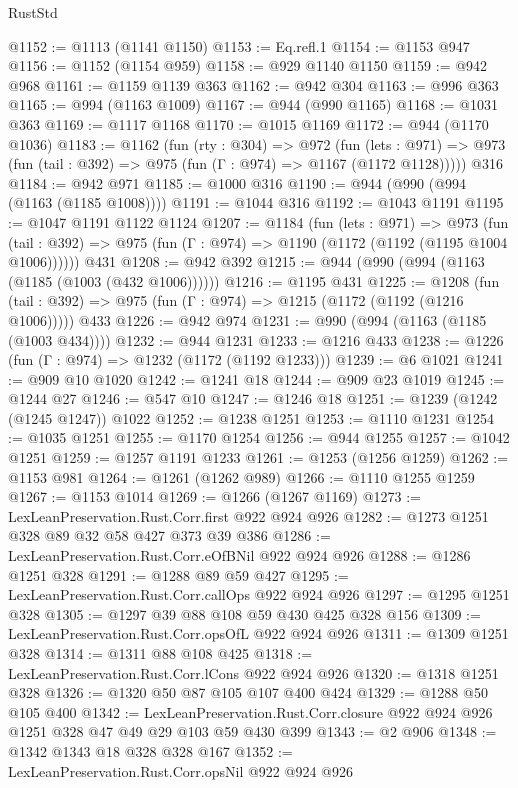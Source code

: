 \begin{lexlean}{RustStd}
\begin{coremodule}
@1152 := @1113 (@1141 @1150)
@1153 := Eq.refl.{1}
@1154 := @1153 @947
@1156 := @1152 (@1154 @959)
@1158 := @929 @1140 @1150
@1159 := @942 @968
@1161 := @1159 @1139 @363
@1162 := @942 @304
@1163 := @996 @363
@1165 := @994 (@1163 @1009)
@1167 := @944 (@990 @1165)
@1168 := @1031 @363
@1169 := @1117 @1168
@1170 := @1015 @1169
@1172 := @944 (@1170 @1036)
@1183 := @1162
    (fun (rty : @304) =>
    @972
      (fun (lets : @971) =>
      @973 (fun (tail : @392) => @975 (fun (Γ : @974) => @1167 (@1172 @1128)))))
    @316
@1184 := @942 @971
@1185 := @1000 @316
@1190 := @944 (@990 (@994 (@1163 (@1185 @1008))))
@1191 := @1044 @316
@1192 := @1043 @1191
@1195 := @1047 @1191 @1122 @1124
@1207 := @1184
    (fun (lets : @971) =>
    @973 (fun (tail : @392) => @975 (fun (Γ : @974) => @1190 (@1172 (@1192 (@1195 @1004 @1006))))))
    @431
@1208 := @942 @392
@1215 := @944 (@990 (@994 (@1163 (@1185 (@1003 (@432 @1006))))))
@1216 := @1195 @431
@1225 := @1208
    (fun (tail : @392) => @975 (fun (Γ : @974) => @1215 (@1172 (@1192 (@1216 @1006)))))
    @433
@1226 := @942 @974
@1231 := @990 (@994 (@1163 (@1185 (@1003 @434))))
@1232 := @944 @1231
@1233 := @1216 @433
@1238 := @1226 (fun (Γ : @974) => @1232 (@1172 (@1192 @1233)))
@1239 := @6 @1021
@1241 := @909 @10 @1020
@1242 := @1241 @18
@1244 := @909 @23 @1019
@1245 := @1244 @27
@1246 := @547 @10
@1247 := @1246 @18
@1251 := @1239 (@1242 (@1245 @1247)) @1022
@1252 := @1238 @1251
@1253 := @1110 @1231
@1254 := @1035 @1251
@1255 := @1170 @1254
@1256 := @944 @1255
@1257 := @1042 @1251
@1259 := @1257 @1191 @1233
@1261 := @1253 (@1256 @1259)
@1262 := @1153 @981
@1264 := @1261 (@1262 @989)
@1266 := @1110 @1255 @1259
@1267 := @1153 @1014
@1269 := @1266 (@1267 @1169)
@1273 := LexLeanPreservation.Rust.Corr.first @922 @924 @926
@1282 := @1273 @1251 @328 @89 @32 @58 @427 @373 @39 @386
@1286 := LexLeanPreservation.Rust.Corr.eOfBNil @922 @924 @926
@1288 := @1286 @1251 @328
@1291 := @1288 @89 @59 @427
@1295 := LexLeanPreservation.Rust.Corr.callOps @922 @924 @926
@1297 := @1295 @1251 @328
@1305 := @1297 @39 @88 @108 @59 @430 @425 @328 @156
@1309 := LexLeanPreservation.Rust.Corr.opsOfL @922 @924 @926
@1311 := @1309 @1251 @328
@1314 := @1311 @88 @108 @425
@1318 := LexLeanPreservation.Rust.Corr.lCons @922 @924 @926
@1320 := @1318 @1251 @328
@1326 := @1320 @50 @87 @105 @107 @400 @424
@1329 := @1288 @50 @105 @400
@1342 := LexLeanPreservation.Rust.Corr.closure
    @922
    @924
    @926
    @1251
    @328
    @47
    @49
    @29
    @103
    @59
    @430
    @399
@1343 := @2 @906
@1348 := @1342 @1343 @18 @328 @328 @167
@1352 := LexLeanPreservation.Rust.Corr.opsNil @922 @924 @926

\end{coremodule}
\end{lexlean}
